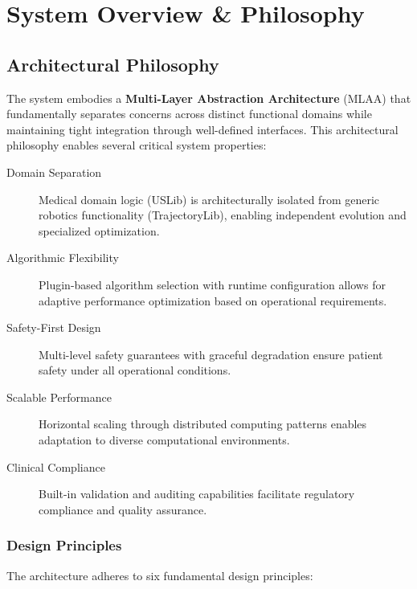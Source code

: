 \chapter{System Overview \& Philosophy}
\label{ch:system_overview}

\section{Architectural Philosophy}
\label{sec:architectural_philosophy}

The \rus{} system embodies a \textbf{Multi-Layer Abstraction Architecture} (\textsc{MLAA}) that fundamentally separates concerns across distinct functional domains while maintaining tight integration through well-defined interfaces. This architectural philosophy enables several critical system properties:

\begin{description}
    \item[Domain Separation] Medical domain logic (USLib) is architecturally isolated from generic robotics functionality (TrajectoryLib), enabling independent evolution and specialized optimization.
    
    \item[Algorithmic Flexibility] Plugin-based algorithm selection with runtime configuration allows for adaptive performance optimization based on operational requirements.
    
    \item[Safety-First Design] Multi-level safety guarantees with graceful degradation ensure patient safety under all operational conditions.
    
    \item[Scalable Performance] Horizontal scaling through distributed computing patterns enables adaptation to diverse computational environments.
    
    \item[Clinical Compliance] Built-in validation and auditing capabilities facilitate regulatory compliance and quality assurance.
\end{description}

\subsection{Design Principles}

The \rus{} architecture adheres to six fundamental design principles:

